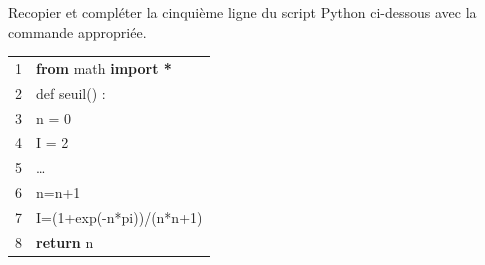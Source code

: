 \documentclass[10pt]{article}
\begin{document}
\begin{enumerate}
Recopier et compléter la cinquième ligne du script Python ci-dessous avec la
commande appropriée.
\begin{center}
\begin{tabular}{|l l|}\hline
1 &\textbf{from} math \textbf{import *}\\
2 &def seuil() :\\
3 &\quad n = 0\\
4 &\quad I = 2\\
5 &\quad \ldots\\
6 &\quad \qquad n=n+1\\
7 &\quad \qquad I=(1+exp(-n*pi))/(n*n+1)\\
8 & \textbf{return} n\\ \hline
\end{tabular}
\end{center}

\end{enumerate}
\end{document}
